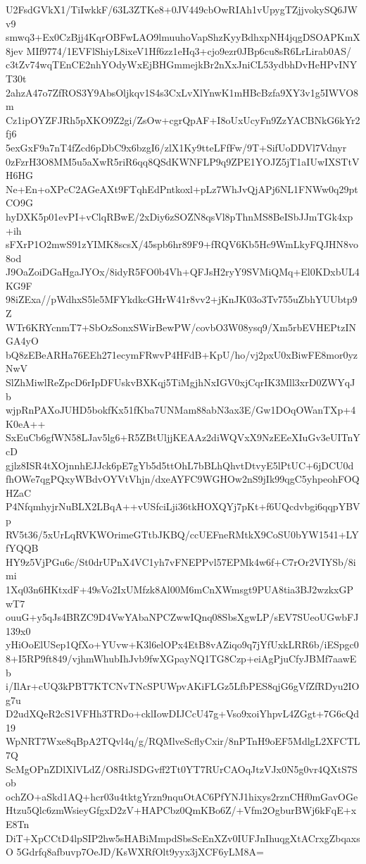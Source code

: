 U2FsdGVkX1/TiIwkkF/63L3ZTKe8+0JV449cbOwRIAh1vUpygTZjjvokySQ6JWv9
smwq3+Ex0CzBjj4KqrOBFwLAO9lmuuhoVapShzKyyBdhxpNH4jqgDSOAPKmX8jev
MIf9774/1EVFlShiyL8ixeV1Hf6zz1eHq3+cjo9ezr0JBp6cu8sR6LrLirab0AS/
c3tZv74wqTEnCE2nhYOdyWxEjBHGmmejkBr2nXxJniCL53ydbhDvHeHPvINYT30t
2ahzA47o7ZfROS3Y9AbsOljkqv1S4s3CxLvXlYnwK1mHBcBzfa9XY3v1g5IWVO8m
Cz1ipOYZFJRh5pXKO9Z2gi/ZsOw+cgrQpAF+I8oUxUcyFn9ZzYACBNkG6kYr2fj6
5exGxF9a7nT4fZcd6pDbC9x6bzgI6/zlX1Ky9tteLFfFw/9T+SifUoDDVl7Vdnyr
0zFzrH3O8MM5u5aXwR5riR6qq8QSdKWNFLP9q9ZPE1YOJZ5jT1aIUwIXSTtVH6HG
Ne+En+oXPcC2AGeAXt9FTqhEdPntkoxl+pLz7WhJvQjAPj6NL1FNWw0q29ptCO9G
hyDXK5p01evPI+vClqRBwE/2xDiy6zSOZN8qsVl8pThnMS8BeISbJJmTGk4xp+ih
sFXrP1O2mwS91zYIMK8scsX/45spb6hr89F9+fRQV6Kb5Hc9WmLkyFQJHN8vo8od
J9OaZoiDGaHgaJYOx/8idyR5FO0b4Vh+QFJsH2ryY9SVMiQMq+El0KDxbUL4KG9F
98iZExa//pWdhxS5le5MFYkdkcGHrW41r8vv2+jKnJK03o3Tv755uZbhYUUbtp9Z
WTr6KRYcnmT7+SbOzSonxSWirBewPW/covbO3W08ysq9/Xm5rbEVHEPtzINGA4yO
bQ8zEBeARHa76EEh271ecymFRwvP4HFdB+KpU/ho/vj2pxU0xBiwFE8mor0yzNwV
SlZhMiwlReZpcD6rIpDFUskvBXKqj5TiMgjhNxIGV0xjCqrIK3Mll3xrD0ZWYqJb
wjpRnPAXoJUHD5bokfKx51fKba7UNMam88abN3ax3E/Gw1DOqOWanTXp+4K0eA++
SxEuCb6gfWN58LJav5lg6+R5ZBtUljjKEAAz2diWQVxX9NzEEeXIuGv3eUITnYcD
gjlz8ISR4tXOjnnhEJJck6pE7gYb5d5ttOhL7bBLhQhvtDtvyE5lPtUC+6jDCU0d
fhOWe7qgPQxyWBdvOYVtVhjn/dxeAYFC9WGHOw2nS9jIk99qgC5yhpeohFOQHZaC
P4NfqmhyjrNuBLX2LBqA++vUSfciLji36tkHOXQYj7pKt+f6UQcdvbgi6qqpYBVp
RV5t36/5xUrLqRVKWOrimeGTtbJKBQ/ccUEFneRMtkX9CoSU0bYW1541+LYfYQQB
HY9z5VjPGu6c/St0drUPnX4VC1yh7vFNEPPvl57EPMk4w6f+C7rOr2VIYSb/8imi
1Xq03n6HKtxdF+49sVo2IxUMfzk8Al00M6mCnXWmsgt9PUA8tia3BJ2wzkxGPwT7
ouuG+y5qJs4BRZC9D4VwYAbaNPCZwwIQnq08SbsXgwLP/sEV7SUeoUGwbFJ139x0
yHiOoElUSep1QfXo+YUvw+K3l6elOPx4EtB8vAZiqo9q7jYfUxkLRR6b/iESpgc0
8+I5RP9ft849/vjhmWhubIhJvb9fwXGpayNQ1TG8Czp+eiAgPjuCfyJBMf7aawEb
i/IlAr+cUQ3kPBT7KTCNvTNcSPUWpvAKiFLGz5LfbPES8qjG6gVfZfRDyu2IOg7u
D2udXQeR2cS1VFHh3TRDo+cklIowDIJCcU47g+Vso9xoiYhpvL4ZGgt+7G6cQd19
WpNRT7Wxe8qBpA2TQvl4q/g/RQMlveScflyCxir/8nPTnH9oEF5MdlgL2XFCTL7Q
ScMgOPnZDlXlVLdZ/O8RiJSDGvff2Tt0YT7RUrCAOqJtzVJx0N5g0vr4QXtS7Sob
ochZO+aSkd1AQ+hcr03u4tktgYrzn9nquOtAC6PfYNJ1hixys2rznCHf0mGavOGe
Htzu5Qlc6zmWsieyGfgxD2zV+HAPCbz0QmKBo6Z/+Vfm2OgburBWj6kFqE+xE8Tn
DiT+XpCCtD4lpSIP2hw5sHABiMmpdSbsScEnXZv0IUFJnIhuqgXtACrxgZbqaxsO
5Gdrfq8afbuvp7OeJD/KsWXRfOlt9yyx3jXCF6yLM8A=
